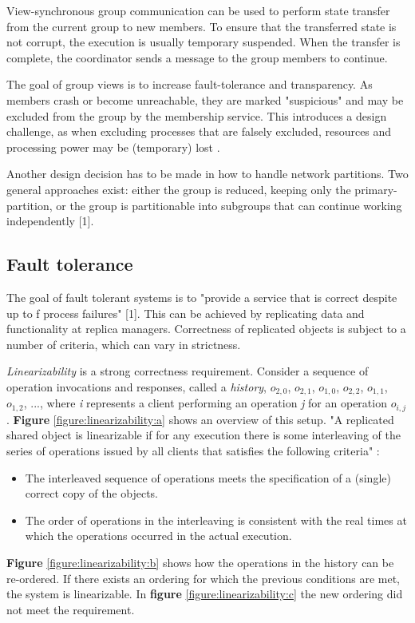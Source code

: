 View-synchronous group communication can be used to perform state transfer from the current group to new members. To ensure that the transferred state is not corrupt, the execution is usually temporary suspended. When the transfer is complete, the coordinator sends a message to the group members to continue.

The goal of group views is to increase fault-tolerance and transparency. As members crash or become unreachable, they are marked "suspicious" and may be excluded from the group by the membership service. This introduces a design challenge, as when excluding processes that are falsely excluded, resources and processing power may be (temporary) lost \cite{Coulouris:2011:DSC:2029110}.

Another design decision has to be made in how to handle network partitions. Two general approaches exist: either the group is reduced, keeping only the primary-partition, or the group is partitionable into subgroups that can continue working independently [1].



\subsection{Fault tolerance}

The goal of fault tolerant systems is to "provide a service that is correct despite up to f process failures" [1]. This can be achieved by replicating data and functionality at replica managers. Correctness of replicated objects is subject to a number of criteria, which can vary in strictness.

\emph{Linearizability} is a strong correctness requirement. Consider a sequence of operation invocations and responses, called a \emph{history}, $o_{2,0}$, $o_{2,1}$, $o_{1,0}$, $o_{2,2}$, $o_{1,1}$, $o_{1,2}$, ..., where \emph{i} represents a client performing an operation \emph{j} for an operation $o_{i,j}$. \textbf{Figure} \ref{figure:linearizability:a} shows an overview of this setup. "A replicated shared object is linearizable if for any execution there is some interleaving of the series of operations issued by all clients that satisfies the following criteria" \cite{Coulouris:2011:DSC:2029110} :
\begin{itemize}
	\item The interleaved sequence of operations meets the specification of a (single) correct copy of the objects.
	\item The order of operations in the interleaving is consistent with the real times at which the operations occurred in the actual execution.
\end{itemize}
\textbf{Figure} \ref{figure:linearizability:b} shows how the operations in the history can be re-ordered. If there exists an ordering for which the previous conditions are met, the system is linearizable. In \textbf{figure} \ref{figure:linearizability:c} the new ordering did not meet the requirement.


